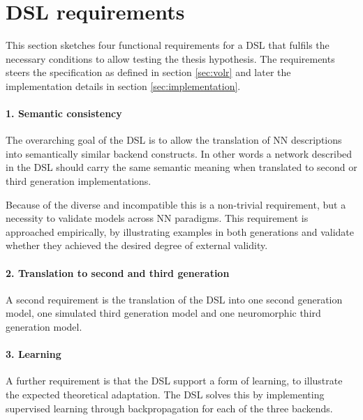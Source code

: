 \documentclass[report.tex]{subfiles}
\begin{document}
%
%

\section{DSL requirements} \label{sec:requirements}
This section sketches four functional requirements for a \gls{DSL} that 
fulfils the necessary conditions to allow testing the thesis hypothesis.
The requirements steers the specification as defined in section 
\ref{sec:volr} and later the implementation details in section
\ref{sec:implementation}.

\paragraph{1. Semantic consistency}
The overarching goal of the \gls{DSL} is to allow the translation 
of \gls{NN} descriptions into semantically similar backend constructs.
In other words a network described in the \gls{DSL} should carry
the same semantic meaning when translated to second or third generation
implementations. 

Because of the diverse and incompatible this is a non-trivial requirement,
but a necessity to validate models across \gls{NN} paradigms.
This requirement is approached empirically, by illustrating examples in
both generations and validate whether they achieved the desired degree
of external validity.

\paragraph{2. Translation to second and third generation}
A second requirement is the translation of the \gls{DSL} into
one second generation model, one simulated third generation model
and one neuromorphic third generation model.

\paragraph{3. Learning}
A further requirement is that the \gls{DSL} support a form of
learning, to illustrate the expected theoretical adaptation.
The \gls{DSL} solves this by implementing supervised 
learning through backpropagation  for each
of the three backends.
\end{document}
